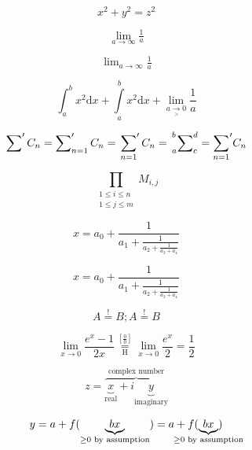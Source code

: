 \documentclass{book}
\begin{document}
\begin{equation}
	\boxed{x^2+y^2 = z^2}
\end{equation}

\begin{equation}
	\lim_{a\to \infty} \tfrac{1}{a}
\end{equation}

\begin{equation}
	\lim\nolimits_{a\to \infty} \tfrac{1}{a}
\end{equation}

\begin{equation}
	\int_a^b x^2  \mathrm{d} x  + \int\limits_a^b x^2  \mathrm{d} x +  \lim_{a \underset{>}{\to} 0} \frac{1}{a}
\end{equation}

\begin{equation}
	\sum\nolimits' C_n =
	\sum_{n=1}\nolimits' C_n =
	\sideset{}{'}\sum_{n=1}C_n =
	\sideset{_a^b}{_c^d}\sum =
		{\sum\limits_{n=1} }'C_n
\end{equation}

\begin{equation}
	\prod_{\substack{
			1\le i \le n\\
			1\le j \le m}}
	M_{i,j}
\end{equation}

\begin{equation}
	x = a_0 + \frac{1}{a_1 + \frac{1}{a_2 + \frac{1}{a_3 + a_4}}}
\end{equation}

\begin{equation}
	x = a_0 + \frac{1}{\displaystyle a_1
		+ \frac{1}{\displaystyle a_2
			+ \frac{1}{\displaystyle a_3 + a_4}}}
\end{equation}

\begin{equation}
	A \overset{!}{=} B; A \stackrel{!}{=} B
\end{equation}

\begin{equation}
	\lim_{x\to 0}{\frac{e^x-1}{2x}}
	\overset{\left[\frac{0}{0}\right]}{\underset{\mathrm{H}}{=}}
	\lim_{x\to 0}{\frac{e^x}{2}}={\frac{1}{2}}
\end{equation}

\begin{equation}
	z = \overbrace{
		\underbrace{x}_\text{real} + i
		\underbrace{y}_\text{imaginary}
	}^\text{complex number}
\end{equation}

\begin{equation}
	y = a + f(\underbrace{b x}_{
		\ge 0 \text{ by assumption}})
	= a + f(\underbrace{b x}_{
		\mathclap{\ge 0 \text{ by assumption}}})
\end{equation}
\end{document}
